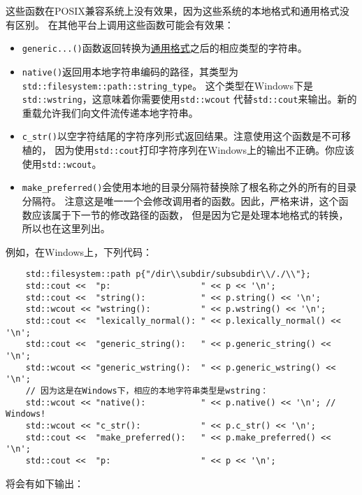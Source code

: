 这些函数在POSIX兼容系统上没有效果，因为这些系统的本地格式和通用格式没有区别。
在其他平台上调用这些函数可能会有效果：
\begin{itemize}
    \item \texttt{generic...()}函数返回转换为\hyperref[ch20.2.3]{通用格式}之后的相应类型的字符串。
    \item \texttt{native()}返回用本地字符串编码的路径，其类型为\texttt{std::filesystem::path::string\_type}。
    这个类型在Windows下是\texttt{std::wstring}，这意味着你需要使用\texttt{std::wcout}
    代替\texttt{std::cout}来输出。新的重载允许我们向文件流传递本地字符串。
    \item \texttt{c\_str()}以空字符结尾的字符序列形式返回结果。注意使用这个函数是不可移植的，
    因为使用\texttt{std::cout}打印字符序列在Windows上的输出不正确。你应该使用\texttt{std::wcout}。
    \item \texttt{make\_preferred()}会使用本地的目录分隔符替换除了根名称之外的所有的目录分隔符。
    注意这是唯一一个会修改调用者的函数。因此，严格来讲，这个函数应该属于下一节的修改路径的函数，
    但是因为它是处理本地格式的转换，所以也在这里列出。
\end{itemize}
例如，在Windows上，下列代码：
\begin{lstlisting}
    std::filesystem::path p{"/dir\\subdir/subsubdir\\/./\\"};
    std::cout <<  "p:                  " << p << '\n';
    std::cout <<  "string():           " << p.string() << '\n';
    std::wcout << "wstring():          " << p.wstring() << '\n';
    std::cout <<  "lexically_normal(): " << p.lexically_normal() << '\n';
    std::cout <<  "generic_string():   " << p.generic_string() << '\n';
    std::wcout << "generic_wstring():  " << p.generic_wstring() << '\n';
    // 因为这是在Windows下，相应的本地字符串类型是wstring：
    std::wcout << "native():           " << p.native() << '\n'; // Windows!
    std::wcout << "c_str():            " << p.c_str() << '\n';
    std::cout <<  "make_preferred():   " << p.make_preferred() << '\n';
    std::cout <<  "p:                  " << p << '\n';
\end{lstlisting}
将会有如下输出：
